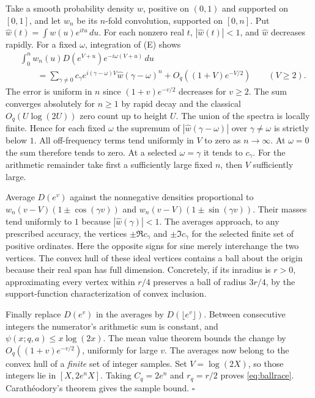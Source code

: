 Take a smooth probability density $w$, positive on $(0,1)$ and supported
on $[0,1]$, and let $w_n$ be its $n$-fold convolution, supported on
$[0,n]$. Put $\widehat w(t)=\int w(u)e^{itu}\,du$. For each nonzero
real $t$, $|\widehat w(t)|<1$, and $\widehat w$ decreases rapidly.
For a fixed $\omega$, integration of (E) shows
\begin{align*}
 &\int_0^n w_n(u) D(e^{V+u})e^{-i\omega(V+u)}\,du \\
 &\qquad=\sum_{\gamma\ne0}
      c_\gamma e^{i(\gamma-\omega)V}\widehat w(\gamma-\omega)^n
       + O_q((1+V)e^{-V/2})\qquad(V\ge 2).
\end{align*}
The error is uniform in $n$ since $(1+v)e^{-v/2}$ decreases for $v\ge2$.
The sum converges absolutely for $n\ge1$ by rapid decay and the
classical $O_q(U\log(2U))$ zero count up to height $U$. The union of
the spectra is locally finite. Hence for each fixed $\omega$ the
supremum of $|\widehat w(\gamma-\omega)|$ over $\gamma\ne\omega$ is
strictly below $1$. All off-frequency terms tend uniformly in $V$ to
zero as $n\to\infty$. At $\omega=0$ the sum therefore tends to zero.
At a selected $\omega=\gamma$ it tends to $c_\gamma$.
For the arithmetic remainder take first a sufficiently large fixed
$n$, then $V$ sufficiently large.

Average $D(e^v)$ against the nonnegative densities proportional to
$w_n(v-V)(1\pm\cos(\gamma v))$ and
$w_n(v-V)(1\pm\sin(\gamma v))$. Their masses tend uniformly to $1$
because $|\widehat w(\gamma)|<1$. The averages approach, to any
prescribed accuracy, the vertices $\pm\Re c_\gamma$ and
$\pm\Im c_\gamma$ for the selected finite set of positive ordinates.
Here the opposite signs for sine merely interchange the two vertices.
The convex hull of these ideal vertices contains a ball about the
origin because their real span has full dimension. Concretely, if its
inradius is $r>0$, approximating every vertex within $r/4$ preserves
a ball of radius $3r/4$, by the support-function characterization of
convex inclusion.

Finally replace $D(e^v)$ in the averages by $D(\lfloor e^v\rfloor)$.
Between consecutive integers the numerator's arithmetic sum is
constant, and $\psi(x;q,a)\leq x\log(2x)$. The mean value theorem
bounds the change by $O_q((1+v)e^{-v/2})$, uniformly for large $v$.
The averages now belong to the convex hull of a \emph{finite} set of
integer samples. Set $V=\log(2X)$, so those integers lie in
$[X,2e^nX]$. Taking $C_q=2e^n$ and $r_q=r/2$ proves
\eqref{eq:ballrace}. Carath\'eodory's theorem gives the sample bound.
\hfill$\square$

